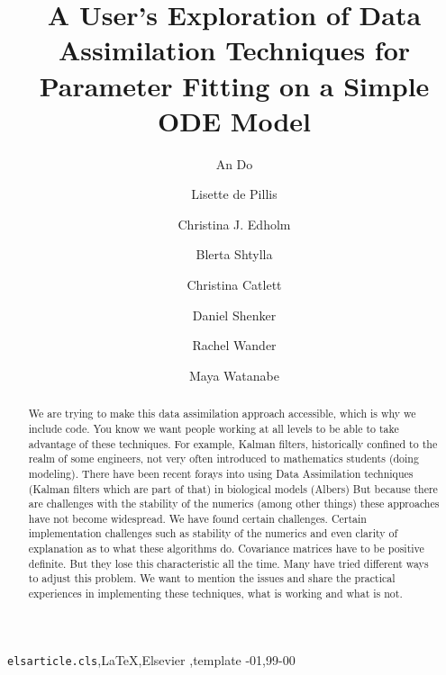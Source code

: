 \documentclass[review]{elsarticle}
\begin{document}
\begin{frontmatter}

\title{A User’s Exploration of Data Assimilation Techniques for Parameter Fitting on a Simple ODE Model }



\author[cgu]{An Do}
\author[harveymudd]{Lisette de Pillis}
\author[scripps]{Christina J. Edholm}
\author[pomona]{Blerta Shtylla}
\author[scripps]{Christina Catlett}
\author[johnshopkins]{Daniel Shenker}
\author[harveymudd]{Rachel Wander}
\author[umass]{Maya Watanabe}


\address[cgu]{Claremont Graduate University, Claremont, CA, USA}
\address[harveymudd]{Harvey Mudd College, Claremont, CA, USA}
\address[scripps]{Scripps College, Claremont, CA, USA}
\address[pomona]{Pomona College, Claremont, CA, USA}
\address[johnshopkins]{Johns Hopkins University, Baltimore, MD, USA}
\address[umass]{University of Massachusetts Amherst, Amherst, MA, USA}




\begin{abstract}
We are trying to make this data assimilation approach accessible, which is why we include code. You know we want people working at all levels to be able to take advantage of these techniques. For example, Kalman filters, historically confined to the realm of some engineers, not very often introduced to mathematics students (doing modeling). There have been recent forays into using Data Assimilation techniques (Kalman filters which are part of that) in biological models (Albers)
But because there are challenges with the stability of the numerics (among other things) these approaches have not become widespread. We have found certain challenges. Certain implementation challenges such as stability of the numerics and even clarity of explanation as to what these algorithms do. Covariance matrices have to be positive definite. But they lose this characteristic all the time. Many have tried different ways to adjust this problem. We want to mention the issues and share the practical experiences in implementing these techniques, what is working and what is not. 
\end{abstract}

\begin{keyword}
\texttt{elsarticle.cls}\sep \LaTeX\sep Elsevier \sep template
-01\sep  99-00
\end{keyword}

\end{frontmatter}
\end{document}
